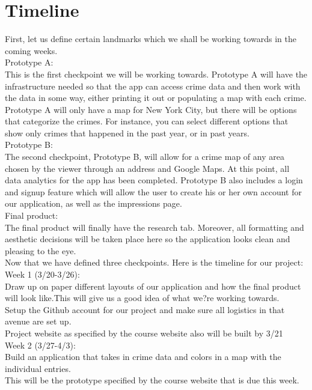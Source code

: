 \documentclass[paper=a4, fontsize=11pt]{scrartcl} %
\numberwithin{equation}{section} %
\numberwithin{figure}{section} %
\numberwithin{table}{section} %
\begin{document}
\section{Timeline}

First, let us define certain landmarks which we shall be working towards in the coming weeks. \\

Prototype A: \\
This is the first checkpoint we will be working towards. Prototype A will have the infrastructure needed so that the app can access crime data and then work with the data in some way, either printing it out or populating a map with each crime. Prototype A will only have a map for New York City, but there will be options that categorize the crimes. For instance, you can select different options that show only crimes that happened in the past year, or in past years. \\

Prototype B: \\
The second checkpoint, Prototype B, will allow for a crime map of any area chosen by the viewer through an address and Google Maps. At this point, all data analytics for the app has been completed. Prototype B also includes a login and signup feature which will allow the user to create his or her own account for our application, as well as the impressions page. \\

Final product: \\
The final product will finally have the research tab. Moreover, all formatting and aesthetic decisions will be taken place here so the application looks clean and pleasing to the eye. \\

Now that we have defined three checkpoints. Here is the timeline for our project: \\

Week 1 (3/20-3/26): \\
Draw up on paper different layouts of our application and how the final product will look like.This will give us a good idea of what we?re working towards. \\
Setup the Github account for our project and make sure all logistics in that avenue are set up. \\
Project website as specified by the course website also will be built by 3/21 \\

Week 2 (3/27-4/3): \\
Build an application that takes in crime data and colors in a map with the individual entries. \\
This will be the prototype specified by the course website that is due this week. \\
\end{document}
